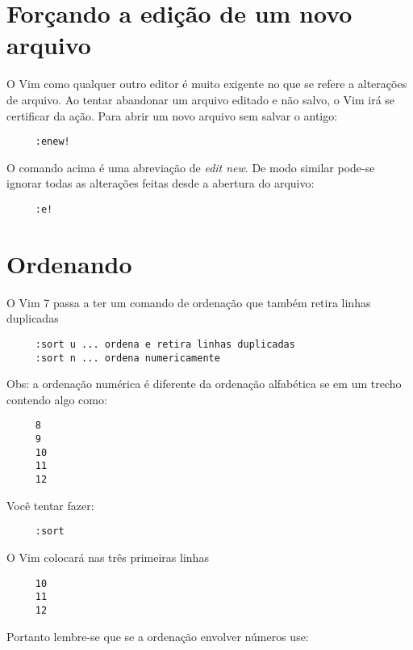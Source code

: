 \section{Forçando a edição de um novo arquivo}\label{sec:Forçando a edição de um novo arquivo}

O Vim como qualquer outro editor é muito exigente no que se refere a alterações
de arquivo.  Ao tentar abandonar um arquivo editado e não salvo, o Vim irá se certificar
da ação. Para abrir um novo arquivo sem salvar o antigo:

\begin{verbatim}
     :enew!
\end{verbatim}

O comando acima é uma abreviação de {\em edit new}. De modo similar pode-se
ignorar todas as alterações feitas desde a abertura do arquivo:

\begin{verbatim}
     :e!
\end{verbatim}


\section{Ordenando}

O Vim 7 passa a ter um comando de ordenação que também retira linhas
duplicadas

\begin{verbatim}
     :sort u ... ordena e retira linhas duplicadas
     :sort n ... ordena numericamente
\end{verbatim}

Obs: a ordenação numérica é diferente da ordenação alfabética se em um
trecho contendo algo como:

\begin{verbatim}
     8
     9
     10
     11
     12
\end{verbatim}

Você tentar fazer:

\begin{verbatim}
     :sort
\end{verbatim}

O Vim colocará nas três primeiras linhas

\begin{verbatim}
     10
     11
     12
\end{verbatim}

Portanto lembre-se que se a ordenação envolver números use:

